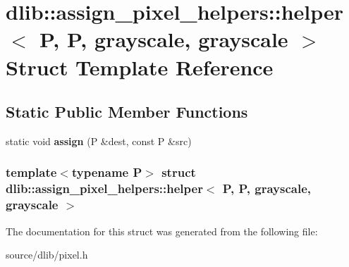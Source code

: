 \hypertarget{structdlib_1_1assign__pixel__helpers_1_1helper_3_01P_00_01P_00_01grayscale_00_01grayscale_01_4}{
\section{dlib::assign\_\-pixel\_\-helpers::helper$<$ P, P, grayscale, grayscale $>$ Struct Template Reference}
\label{structdlib_1_1assign__pixel__helpers_1_1helper_3_01P_00_01P_00_01grayscale_00_01grayscale_01_4}
}
\subsection*{Static Public Member Functions}
\begin{DoxyCompactItemize}
\item 
\hypertarget{structdlib_1_1assign__pixel__helpers_1_1helper_3_01P_00_01P_00_01grayscale_00_01grayscale_01_4_a9cd5bcfdaa1f0a3037e6d863ab6e92c5}{
static void {\bfseries assign} (P \&dest, const P \&src)}
\label{structdlib_1_1assign__pixel__helpers_1_1helper_3_01P_00_01P_00_01grayscale_00_01grayscale_01_4_a9cd5bcfdaa1f0a3037e6d863ab6e92c5}

\end{DoxyCompactItemize}
\subsubsection*{template$<$typename P$>$ struct dlib::assign\_\-pixel\_\-helpers::helper$<$ P, P, grayscale, grayscale $>$}



The documentation for this struct was generated from the following file:\begin{DoxyCompactItemize}
\item 
source/dlib/pixel.h\end{DoxyCompactItemize}
